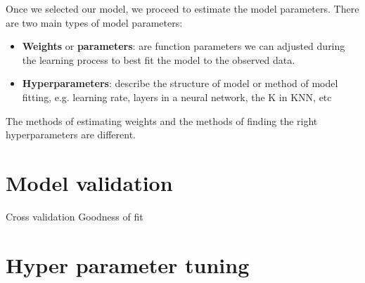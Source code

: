 Once we selected our model, we proceed to estimate the model parameters. There are two main types of model parameters:
\begin{itemize}
    \item \textbf{Weights} or \textbf{parameters}: are function parameters we can adjusted during the learning process to best fit the model to the observed data.
    \item \textbf{Hyperparameters}: describe the structure of model or method of model fitting, e.g. learning rate, layers in a neural network, the K in KNN, etc
\end{itemize}

The methods of estimating weights and the methods of finding the right hyperparameters are different.

\section{Model validation}

Cross validation
Goodness of fit

\section{Hyper parameter tuning}

